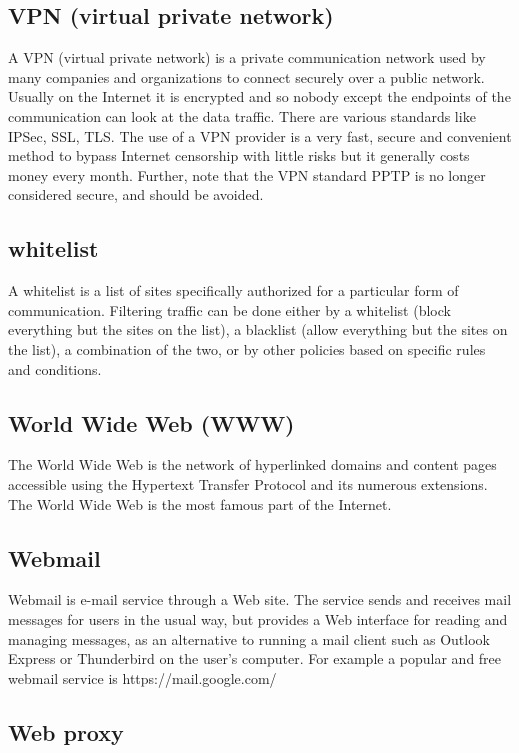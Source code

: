 \subsection{VPN (virtual private network)}

A VPN (virtual private network) is a private communication network used
by many companies and organizations to connect securely over a public
network. Usually on the Internet it is encrypted and so nobody except
the endpoints of the communication can look at the data traffic. There
are various standards like IPSec, SSL, TLS. The use of a VPN provider is
a very fast, secure and convenient method to bypass Internet censorship
with little risks but it generally costs money every month. Further,
note that the VPN standard PPTP is no longer considered secure, and
should be avoided.

\subsection{whitelist}

A whitelist is a list of sites specifically authorized for a particular
form of communication. Filtering traffic can be done either by a
whitelist (block everything but the sites on the list), a blacklist
(allow everything but the sites on the list), a combination of the two,
or by other policies based on specific rules and conditions.

\subsection{World Wide Web (WWW)}

The World Wide Web is the network of hyperlinked domains and content
pages accessible using the Hypertext Transfer Protocol and its numerous
extensions. The World Wide Web is the most famous part of the Internet.

\subsection{Webmail}

Webmail is e-mail service through a Web site. The service sends and
receives mail messages for users in the usual way, but provides a Web
interface for reading and managing messages, as an alternative to
running a mail client such as Outlook Express or Thunderbird on the
user's computer. For example a popular and free webmail service is
https://mail.google.com/

\subsection{Web proxy}

